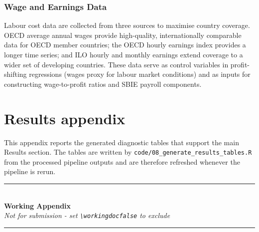 \documentclass[11pt,a4paper]{article}
\begin{document}
\subsubsection{Wage and Earnings Data}\label{sec:wages}
Labour cost data are collected from three sources to maximise country coverage. OECD average annual wages provide high-quality, internationally comparable data for OECD member countries; the OECD hourly earnings index provides a longer time series; and ILO hourly and monthly earnings extend coverage to a wider set of developing countries.  These data serve as control variables in profit-shifting regressions (wages proxy for labour market conditions) and as inputs for constructing wage-to-profit ratios and SBIE payroll components.

\newpage
\section{Results appendix}\label{app:results}

This appendix reports the generated diagnostic tables that support the main Results section. The tables are written by \texttt{code/08\_generate\_results\_tables.R} from the processed pipeline outputs and are therefore refreshed whenever the pipeline is rerun.



\newpage
\ifworkingdoc

\begin{center}
  \rule{\textwidth}{1pt}\\[0.8em]
  {\Large\bfseries Working Appendix}\\[0.4em]
  {\normalsize\itshape Not for submission - set \texttt{\textbackslash workingdocfalse} to exclude}\\[0.8em]
  \rule{\textwidth}{1pt}
\end{center}

\vspace{1em}

\renewcommand{\thesection}{W.\arabic{section}}
\renewcommand{\theHsection}{working.\arabic{section}}
\renewcommand{\theHsubsection}{working.\arabic{section}.\arabic{subsection}}
\renewcommand{\theHsubsubsection}{working.\arabic{section}.\arabic{subsection}.\arabic{subsubsection}}
\renewcommand{\theHtable}{working.\arabic{section}.\arabic{table}}
\renewcommand{\theHfigure}{working.\arabic{section}.\arabic{figure}}
\renewcommand{\theHequation}{working.\arabic{section}.\arabic{equation}}
\setcounter{section}{0}
\setcounter{table}{0}
\setcounter{figure}{0}
\setcounter{equation}{0}
\end{document}

